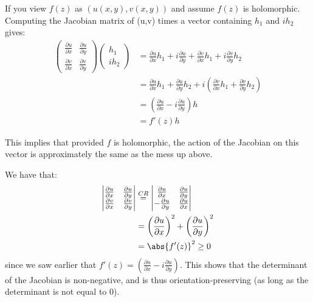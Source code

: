 \begin{remark}
If you view $f(z)$ as $(u(x,y), v(x,y))$ and assume $f(z)$ is holomorphic. Computing the Jacobian matrix of (u,v) times a vector containing $h_1$ and $ih_2$ gives:
\begin{align*}
    \left( 
    \begin{matrix}
        \frac{\partial u}{\partial x} & \frac{\partial u}{\partial y} \\
        \frac{\partial v}{\partial x} & \frac{\partial v}{\partial y}
    \end{matrix}
    \right)
    \left(
    \begin{matrix}
        h_1 \\
        ih_2
    \end{matrix}
    \right)
    &= \frac{\partial u}{\partial x}h_1 +i\frac{\partial u}{\partial y} + \frac{\partial v}{\partial x}h_1 +i\frac{\partial v}{\partial y}h_2\\
    &=\frac{\partial u}{\partial x}h_1 + \frac{\partial u}{\partial y}h_2 + i\left(\frac{\partial v}{\partial x}h_1 + \frac{\partial v}{\partial y}h_2\right)\\
    &=\left(\frac{\partial u}{\partial x} -i\frac{\partial u}{\partial y}  \right)h\\
    &= f'(z)h
\end{align*}

This implies that provided $f$ is holomorphic, the action of the Jacobian on this vector is approximately the same as the mess up above.
\end{remark}

\begin{remark}
We have that:
\begin{align*}
    \left|
    \begin{matrix}
        \frac{\partial u}{\partial x} & \frac{\partial u}{\partial y} \\
        \frac{\partial v}{\partial x} & \frac{\partial v}{\partial y}
    \end{matrix}
    \right|
    &\overset{CR}{=}
    \left|
    \begin{matrix}
        \frac{\partial u}{\partial x} & \frac{\partial u}{\partial y} \\
        -\frac{\partial u}{\partial y} & \frac{\partial u}{\partial x}
    \end{matrix} \right|\\
    &= \left(\frac{\partial u}{\partial x}\right)^2 + \left(\frac{\partial u}{\partial y}\right)^2\\
    &= \abs{f'(z)}^2\geq 0
\end{align*}
since we saw earlier that $f'(z) = \left( \frac{\partial u}{\partial x} -i\frac{\partial u}{\partial y}\right)$. This shows that the determinant of the Jacobian is non-negative, and is thus orientation-preserving (as long as the determinant is not equal to $0$).
\end{remark}
